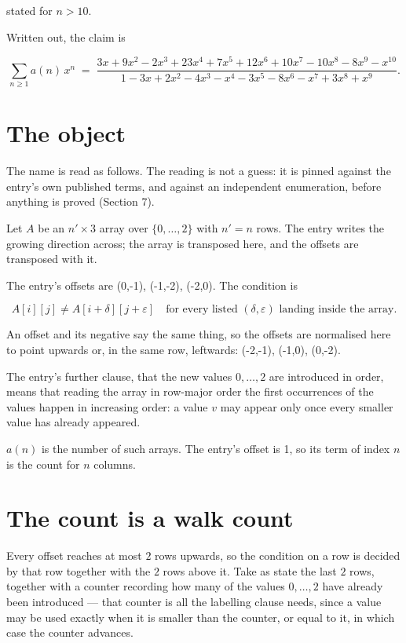 \documentclass[11pt]{article}
\theoremstyle{definition}
\begin{document}
stated for $n > 10$.

Written out, the claim is

\[\sum_{n \ge 1} a(n)\,x^n \;=\; \frac{3x + 9x^{2} - 2x^{3} + 23x^{4} + 7x^{5} + 12x^{6} + 10x^{7} - 10x^{8} - 8x^{9} - x^{10}}{1 - 3x + 2x^{2} - 4x^{3} - x^{4} - 3x^{5} - 8x^{6} - x^{7} + 3x^{8} + x^{9}}.\]

\section{The object}

The name is read as follows. The reading is not a guess: it is pinned against the entry's own published terms, and against an independent enumeration, before anything is proved (Section 7).

Let $A$ be an $n' \times 3$ array over $\{0,\dots,2\}$ with $n' = n$ rows. The entry writes the growing direction across; the array is transposed here, and the offsets are transposed with it.

The entry's offsets are (0,-1), (-1,-2), (-2,0). The condition is

\[A[i][j] \ne A[i{+}\delta][j{+}\varepsilon]\quad\text{for every listed }(\delta,\varepsilon)\text{ landing inside the array.}\]

An offset and its negative say the same thing, so the offsets are normalised here to point upwards or, in the same row, leftwards: (-2,-1), (-1,0), (0,-2).

The entry's further clause, that the new values $0,\dots,2$ are introduced in order, means that reading the array in row-major order the first occurrences of the values happen in increasing order: a value $v$ may appear only once every smaller value has already appeared.

$a(n)$ is the number of such arrays. The entry's offset is 1, so its term of index $n$ is the count for $n$ columns.

\section{The count is a walk count}

Every offset reaches at most $2$ rows upwards, so the condition on a row is decided by that row together with the $2$ rows above it. Take as state the last $2$ rows, together with a counter recording how many of the values $0,\dots,2$ have already been introduced --- that counter is all the labelling clause needs, since a value may be used exactly when it is smaller than the counter, or equal to it, in which case the counter advances.
\end{document}

